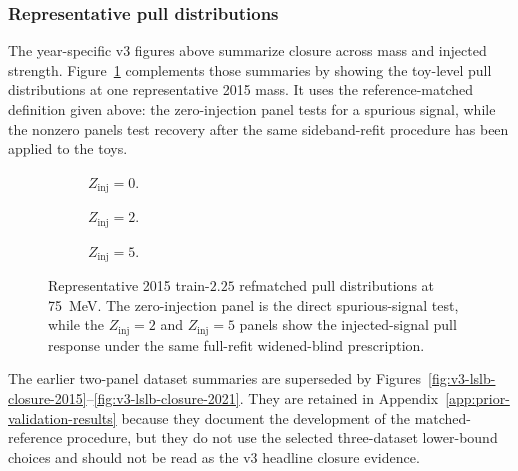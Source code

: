 \subsubsection{Representative pull distributions}

The year-specific v3 figures above summarize closure across mass and injected strength.
Figure~\ref{fig:refmatched-train225-pulls-2015} complements those summaries by showing
the toy-level pull distributions at one representative 2015 mass. It uses the
reference-matched definition given above: the zero-injection panel tests for a spurious
signal, while the nonzero panels test recovery after the same sideband-refit procedure
has been applied to the toys.

\begin{figure}[p]
\centering
\begin{subfigure}[t]{0.60\linewidth}
  \centering
  \caption{$Z_{\mathrm{inj}}=0$.}
\end{subfigure}
\par\vspace{0.25em}
\begin{subfigure}[t]{0.60\linewidth}
  \centering
  \caption{$Z_{\mathrm{inj}}=2$.}
\end{subfigure}
\par\vspace{0.25em}
\begin{subfigure}[t]{0.60\linewidth}
  \centering
  \caption{$Z_{\mathrm{inj}}=5$.}
\end{subfigure}
\caption{Representative 2015 train-$2.25$ refmatched pull distributions at
\SI{75}{MeV}. The zero-injection panel is the direct spurious-signal test, while the
$Z_{\mathrm{inj}}=2$ and $Z_{\mathrm{inj}}=5$ panels show the injected-signal pull
response under the same full-refit widened-blind prescription.}
\label{fig:refmatched-train225-pulls-2015}
\end{figure}

The earlier two-panel dataset summaries are superseded by
Figures~\ref{fig:v3-lslb-closure-2015}--\ref{fig:v3-lslb-closure-2021}. They are retained
in Appendix~\ref{app:prior-validation-results} because they document the development of
the matched-reference procedure, but they do not use the selected three-dataset lower-bound
choices and should not be read as the v3 headline closure evidence.

